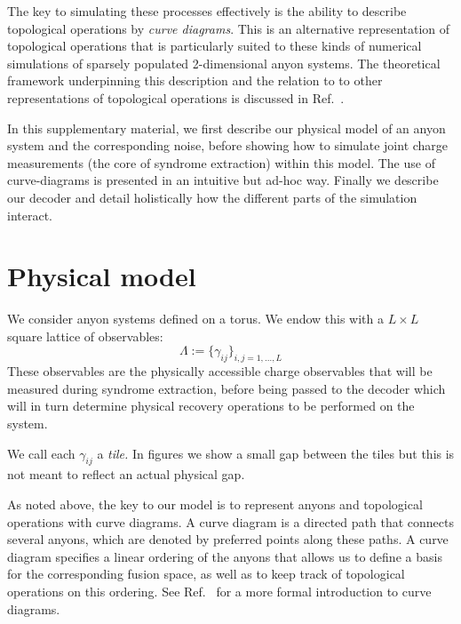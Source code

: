 \documentclass[aps, letterpaper, onecolumn, superscriptaddress, notitlepage, 10pt]{revtex4-1}
\begin{document}
The key to simulating these processes effectively is the ability to describe topological operations by \emph{curve diagrams}. This is an alternative representation of topological operations that is particularly suited to these kinds of numerical simulations of sparsely populated 2-dimensional anyon systems. The theoretical framework underpinning this description and the relation to to other representations of topological operations is discussed in Ref.~\cite{Burton2016}.

In this supplementary material, we first describe our physical model of an anyon system and the corresponding noise, before showing how to simulate joint charge measurements (the core of syndrome extraction) within this model. The use of curve-diagrams is presented in an intuitive but ad-hoc way. Finally we describe our decoder and detail holistically how the different parts of the simulation interact.


\section{Physical model}

We consider anyon systems defined on a torus.
We endow this with a $L\times L$ square lattice of observables:
$$
    \Lambda := \bigl\{ \gamma_{ij} \bigr\}_{i,j=1,...,L}
$$
These observables are the physically accessible charge observables that will be measured during syndrome extraction, before being passed to the decoder which will in turn determine physical recovery operations to be performed on the system.

We call each $\gamma_{ij}$ a \emph{tile.}
In figures we show a small gap between the tiles but this is not meant
to reflect an actual physical gap.

As noted above, the key to our model is to represent anyons and topological operations with curve diagrams. A curve diagram is a directed path that connects several anyons, which are denoted by preferred points along these paths. A curve diagram specifies a linear ordering of the anyons that allows us to define a basis for the corresponding fusion space, as well as to keep track of topological operations on this ordering. See Ref.~\cite{Burton2016} for a more formal introduction to curve diagrams.

\end{document}
